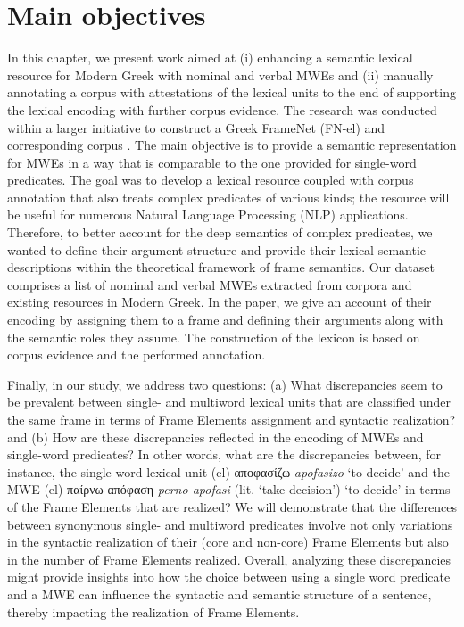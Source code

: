 \documentclass[output=paper,colorlinks,citecolor=brown]{langscibook}
\begin{document}
\section{Main objectives}
\label{sec:objectives}
In this chapter, we present work aimed at (i) enhancing a semantic lexical resource for Modern Greek with nominal and verbal MWEs and (ii) manually annotating a corpus with attestations of the lexical units to the end of supporting the lexical encoding with further corpus evidence. The research was conducted within a larger initiative to construct a Greek FrameNet (FN-el) and corresponding corpus \citep{giouli_etal_2020,pilitsidou_giouli_2020}. The main objective is to provide a semantic representation for MWEs in a way that is comparable to the one provided for single-word predicates. The goal was to develop a lexical resource coupled with corpus annotation that also treats complex predicates of various kinds; the resource will be useful for numerous Natural Language Processing (NLP) applications.
Therefore, to better account for the deep semantics of complex predicates, we wanted to define their argument structure and provide their lexical-semantic descriptions within the theoretical framework of frame semantics. Our dataset comprises a list of nominal and verbal MWEs extracted from corpora and existing resources in Modern Greek. In the paper, we give an account of their encoding by assigning them to a frame and defining their arguments along with the semantic roles they assume. The construction of the lexicon is based on corpus evidence and the performed annotation.

Finally, in our study, we address two questions: (a) What discrepancies seem to be prevalent between single- and multiword lexical units that are classified under the same frame in terms of Frame Elements assignment and syntactic realization? and (b) How are these discrepancies reflected in the encoding of MWEs and single-word predicates? In other words, what are the discrepancies between, for instance, the single word lexical unit (el) {{αποφασίζω}} \textit{apofasizo} `to decide' and the MWE (el) {{παίρνω απόφαση}} \textit{perno apofasi} (lit. `take decision') `to decide' in terms of the Frame Elements that are realized? We will demonstrate that the differences between synonymous single- and multiword predicates involve not only variations in the syntactic realization of their (core and non-core) Frame Elements but also in the number of Frame Elements realized. Overall, analyzing these discrepancies might provide insights into how the choice between using a single word predicate and a MWE can influence the syntactic and semantic structure of a sentence, thereby impacting the realization of Frame Elements.
\end{document}
